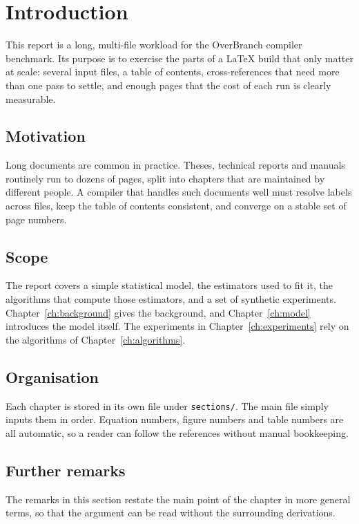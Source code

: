 \chapter{Introduction}\label{ch:intro}

This report is a long, multi-file workload for the OverBranch compiler
benchmark. Its purpose is to exercise the parts of a \LaTeX{} build that
only matter at scale: several input files, a table of contents, cross-references
that need more than one pass to settle, and enough pages that the cost of
each run is clearly measurable.

\section{Motivation}\label{sec:motivation}

Long documents are common in practice. Theses, technical reports and
manuals routinely run to dozens of pages, split into chapters that are
maintained by different people. A compiler that handles such documents well
must resolve labels across files, keep the table of contents consistent, and
converge on a stable set of page numbers.

\lipsum[1-2]

\section{Scope}\label{sec:scope}

The report covers a simple statistical model, the estimators used to fit it,
the algorithms that compute those estimators, and a set of synthetic
experiments. Chapter~\ref{ch:background} gives the background, and
Chapter~\ref{ch:model} introduces the model itself. The experiments in
Chapter~\ref{ch:experiments} rely on the algorithms of
Chapter~\ref{ch:algorithms}.

\lipsum[3-4]

\section{Organisation}\label{sec:organisation}

Each chapter is stored in its own file under \texttt{sections/}. The main file
simply inputs them in order. Equation numbers, figure numbers and table
numbers are all automatic, so a reader can follow the references without
manual bookkeeping.

\lipsum[5-6]

\section{Further remarks}\label{sec:further-introduction}

The remarks in this section restate the main point of the chapter in more
general terms, so that the argument can be read without the surrounding
derivations.

\lipsum[51-62]
